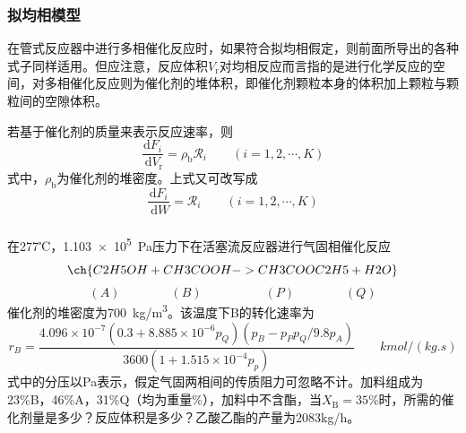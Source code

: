 \begin{frame}
    \frametitle{拟均相模型}

    在管式反应器中进行多相催化反应时，如果符合拟均相假定，则前面所导出的各种式子同样适用。但应注意，反应体积$V_\mathrm{r}$对均相反应而言指的是进行化学反应的空间，对多相催化反应则为催化剂的堆体积，即催化剂颗粒本身的体积加上颗粒与颗粒间的空隙体积。
    
    若基于催化剂的质量来表示反应速率，则
    \[
        \frac{\mathrm{d} F_{i}}{\mathrm{~d} V_{\mathrm{r}}}=\rho_\mathrm{b} \mathscr{R}_{i} \qquad(i=1,2, \cdots, K)
    \]
    式中，$\rho_\mathrm{b}$为催化剂的堆密度。上式又可改写成
    \[
        \frac{\mathrm{d} F_{i}}{\mathrm{~d} W}=\mathscr{R}_{i} \qquad(i=1,2, \cdots, K)
    \]

\end{frame}


\begin{frame}[t]
    \frametitle{}

    \begin{example}
        在277℃，\SI{1.103e5}{Pa}压力下在活塞流反应器进行气固相催化反应
        \[
            \ch{C2H5OH + CH3COOH -> CH3COOC2H5 + H2O}
        \]
        \[
            (A)\qquad \qquad (B)\qquad \qquad \quad (P) \qquad \qquad (Q)
        \]
        催化剂的堆密度为\SI{700}{kg/m^3}。该温度下B的转化速率为
        \[
            r_{B}=\frac{4.096 \times 10^{-7}(0.3+8.885 \times 10^{-6} p_{Q})(p_{B}-p_{P} p_{Q} / 9.8 p_{A})}{3600(1+1.515 \times 10^{-4} p_{p})} \qquad \si{kmol/(kg.s)}
        \]
        式中的分压以Pa表示，假定气固两相间的传质阻力可忽略不计。加料组成为23\%B，46\%A，31\%Q（均为重量\%），加料中不含酯，当$X_\mathrm{B}=35\%$时，所需的催化剂量是多少？反应体积是多少？乙酸乙酯的产量为2083kg/h。

    \end{example}

\end{frame}